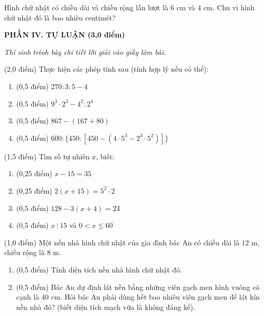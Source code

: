 \documentclass[12pt,a4paper]{article}
\begin{document}
\begin{ex}
Hình chữ nhật có chiều dài và chiều rộng lần lượt là $6\text{ cm}$ và $4\text{ cm}$. Chu vi hình chữ nhật đó là bao nhiêu centimét? 
\end{ex}


\setcounter{ex}{0}
\noindent\textbf{\large PHẦN IV. TỰ LUẬN (3,0 điểm)}

\textit{Thí sinh trình bày chi tiết lời giải vào giấy làm bài.}

\vspace{1mm}
\begin{ex} (2,0 điểm)
Thực hiện các phép tính sau (tính hợp lý nếu có thể):
\begin{enumerate}[label=\textbf{\alph*)}, leftmargin=0.8cm, itemsep=2pt]
\item (0,5 điểm) $270 : 3 : 5 - 4$
\item (0,5 điểm) $9^3 \cdot 2^3 - 4^2 : 2^4$
\item (0,5 điểm) $867 - (167 + 80)$
\item (0,5 điểm) $600 : \{450 : [450 - (4 \cdot 5^3 - 2^3 \cdot 5^2)]\}$
\end{enumerate}
\end{ex}
\vspace{1.5mm}

\begin{ex} (1,5 điểm)
Tìm số tự nhiên $x$, biết:
\begin{enumerate}[label=\textbf{\alph*)}, leftmargin=0.8cm, itemsep=2pt]
\item (0,25 điểm) $x - 15 = 35$
\item (0,25 điểm) $2(x + 15) = 5^2 \cdot 2$
\item (0,5 điểm) $128 - 3(x + 4) = 23$
\item (0,5 điểm) $x \ \vdots \ 15$ và $0 < x \le 60$
\end{enumerate}
\end{ex}
\vspace{1.5mm}

\begin{ex} (1,0 điểm)
Một nền nhà hình chữ nhật của gia đình bác An có chiều dài là $12\text{ m}$, chiều rộng là $8\text{ m}$.
\begin{enumerate}[label=\textbf{\alph*)}, leftmargin=0.8cm, itemsep=2pt]
\item (0,5 điểm) Tính diện tích nền nhà hình chữ nhật đó.
\item (0,5 điểm) Bác An dự định lát nền bằng những viên gạch men hình vuông có cạnh là $40\text{ cm}$. Hỏi bác An phải dùng hết bao nhiêu viên gạch men để lát kín nền nhà đó? (biết diện tích mạch vữa là không đáng kể).
\end{enumerate}
\end{ex}
\vspace{1.5mm}
\end{document}
